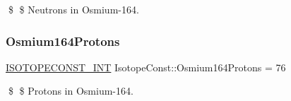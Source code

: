 \$ \$ Neutrons in Osmium-\/164. \mbox{\label{group___isotope_const-_osmium-_os164_gaf33de3632f0889cd4c248559579bc9fc}} 
\subsubsection{\texorpdfstring{Osmium164\+Protons}{Osmium164Protons}}
{\footnotesize\ttfamily \mbox{\hyperlink{group___isotope_const-_macros_ga5f18360b3e99483a35c32d789e62621c}{I\+S\+O\+T\+O\+P\+E\+C\+O\+N\+S\+T\+\_\+\+I\+NT}} Isotope\+Const\+::\+Osmium164\+Protons = 76}

\$ \$ Protons in Osmium-\/164. 